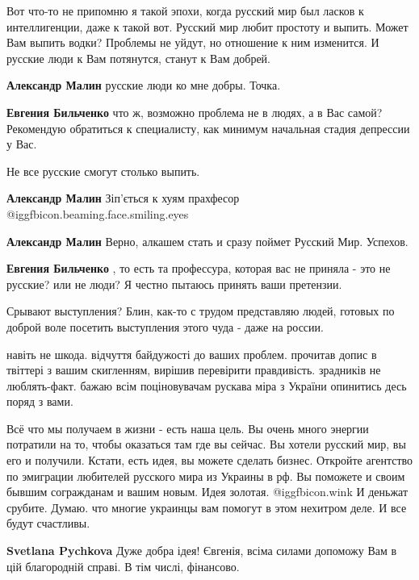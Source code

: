 \begin{itemize}
Вот что-то не припомню я такой эпохи, когда русский мир был ласков к
интеллигенции, даже к такой вот. Русский мир любит простоту и выпить. Может Вам
выпить водки? Проблемы не уйдут, но отношение к ним изменится. И русские люди к
Вам потянутся, станут к Вам добрей.

\begin{itemize} %
\textbf{Александр Малин} русские люди ко мне добры. Точка.

\textbf{Евгения Бильченко} что ж, возможно проблема не в людях, а в Вас самой? Рекомендую обратиться к специалисту, как минимум начальная стадия депрессии у Вас.

Не все русские смогут столько выпить.

\textbf{Александр Малин} Зіп'ється к хуям прахфесор  @igg{fbicon.beaming.face.smiling.eyes} 

\textbf{Александр Малин} Верно, алкашем стать и сразу поймет Русский Мир. Успехов.

\textbf{Евгения Бильченко} , то есть та профессура, которая вас не приняла - это не русские? или не люди? Я честно пытаюсь принять ваши претензии.
\end{itemize} %


Срывают выступления? Блин, как-то с трудом представляю людей, готовых по доброй
воле посетить выступления этого чуда - даже на россии.


навіть не шкода. відчуття байдужості до ваших проблем. прочитав допис в
твіттері з вашим скигленням, вирішив перевірити правдивість. зрадників не
люблять-факт. бажаю всім поціновувачам рускава міра з України опинитись десь
поряд з вами.



Всё что мы получаем в жизни - есть наша цель. Вы очень много энергии потратили
на то, чтобы оказаться там где вы сейчас. Вы хотели русский мир, вы его и
получили. Кстати, есть идея, вы можете сделать бизнес. Откройте агентство по
эмиграции любителей русского мира из Украины в рф. Вы поможете и своим бывшим
согражданам и вашим новым. Идея золотая.  @igg{fbicon.wink} И деньжат срубите. Думаю. что многие
украинцы вам помогут в этом нехитром деле. И все будут счастливы.

\begin{itemize} %
\textbf{Svetlana Pychkova} Дуже добра ідея! Євгенія, всіма силами допоможу Вам в цій благородній справі. В тім числі, фінансово.



\end{itemize}
\end{itemize}
